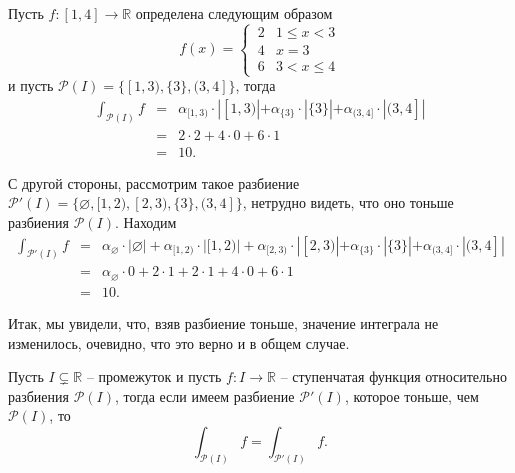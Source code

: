 \begin{example}\label{int_[1,4]=10}
    Пусть $f: [1,4] \to \mathbb{R}$ определена следующим образом
    \[
     f(x)  = \begin{cases}
          \, 2 & 1 \le x <3 \\
          \, 4 & x = 3 \\
          \, 6 & 3< x \le 4
     \end{cases}
    \]
    и пусть $\mathscr{P}(I) = \{ [1,3), \{3\}, (3,4] \}$, тогда
 \begin{eqnarray*}
  \int_{\mathscr{P}(I)} f  &=& \alpha_{[1,3)}\cdot | [1,3) | + \alpha_{\{3\}}\cdot |\{3\}| + \alpha_{(3,4]} \cdot | (3,4] | \\
  &=& 2 \cdot 2 + 4 \cdot 0 + 6 \cdot 1 \\
  &=& 10.
 \end{eqnarray*}

 С другой стороны, рассмотрим такое разбиение $\mathscr{P}'(I) = \{ \varnothing, [1,2), [2,3), \{3\}, (3,4] \}$, нетрудно видеть, что оно тоньше разбиения $\mathscr{P}(I)$. Находим
 \begin{eqnarray*}
     \int_{\mathscr{P}'(I)}f &=&\alpha_\varnothing \cdot |\varnothing| + \alpha_{[1,2)} \cdot | [1,2) | + \alpha_{[2,3)} \cdot |[2,3)| + \alpha_{\{3\}}\cdot |\{3\}| + \alpha_{(3,4]} \cdot | (3,4] | \\
     &=& \alpha_\varnothing \cdot 0 + 2 \cdot 1 + 2 \cdot 1 + 4 \cdot 0 + 6 \cdot 1 \\
     &=& 10.
 \end{eqnarray*}
 
\end{example}

Итак, мы увидели, что, взяв разбиение тоньше, значение интеграла не изменилось, очевидно, что это верно и в общем случае.

\begin{lemma}
  Пусть $I \subsetneq \mathbb{R}$ -- промежуток и пусть $f:I \to \mathbb{R}$ -- ступенчатая функция относительно разбиения $\mathscr{P}(I)$, тогда если имеем разбиение $\mathscr{P}'(I)$, которое тоньше, чем $\mathscr{P}(I)$, то
  \[
   \int_{\mathscr{P}(I)}f = \int_{\mathscr{P}'(I)}f.
  \]
\end{lemma}

